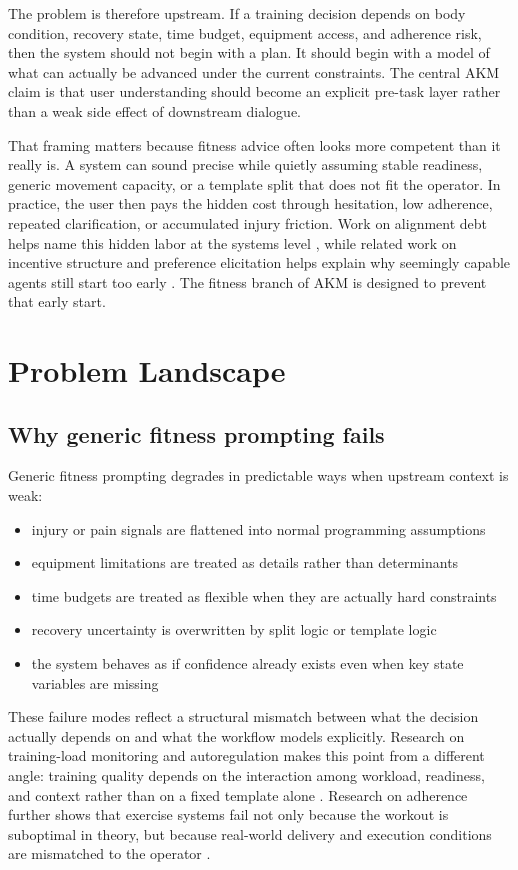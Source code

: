 \documentclass[11pt]{article}
\begin{document}
The problem is therefore upstream. If a training decision depends on body condition, recovery state, time budget, equipment access, and adherence risk, then the system should not begin with a plan. It should begin with a model of what can actually be advanced under the current constraints. The central AKM claim is that user understanding should become an explicit pre-task layer rather than a weak side effect of downstream dialogue.

That framing matters because fitness advice often looks more competent than it really is. A system can sound precise while quietly assuming stable readiness, generic movement capacity, or a template split that does not fit the operator. In practice, the user then pays the hidden cost through hesitation, low adherence, repeated clarification, or accumulated injury friction. Work on alignment debt helps name this hidden labor at the systems level \citep{oyemike2025alignment}, while related work on incentive structure and preference elicitation helps explain why seemingly capable agents still start too early \citep{holstein2025thinking,foschini2025preference,white2023prompt}. The fitness branch of AKM is designed to prevent that early start.
\section{Problem Landscape}
\subsection{Why generic fitness prompting fails}
Generic fitness prompting degrades in predictable ways when upstream context is weak:
\begin{itemize}[leftmargin=1.5em]
\item injury or pain signals are flattened into normal programming assumptions
\item equipment limitations are treated as details rather than determinants
\item time budgets are treated as flexible when they are actually hard constraints
\item recovery uncertainty is overwritten by split logic or template logic
\item the system behaves as if confidence already exists even when key state variables are missing
\end{itemize}
These failure modes reflect a structural mismatch between what the decision actually depends on and what the workflow models explicitly. Research on training-load monitoring and autoregulation makes this point from a different angle: training quality depends on the interaction among workload, readiness, and context rather than on a fixed template alone \citep{foster2017trainingloads,shattock2022autoregulation,haddad2017sessionrpe}. Research on adherence further shows that exercise systems fail not only because the workout is suboptimal in theory, but because real-world delivery and execution conditions are mismatched to the operator \citep{fuentevidal2022adherence}.
\end{document}
